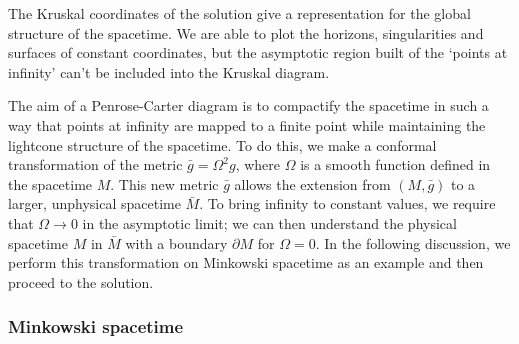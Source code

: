 The Kruskal coordinates of the \sch solution give a representation for the global structure of the spacetime. We are able to plot the horizons, singularities and surfaces of constant coordinates, but the asymptotic region built of the `points at infinity' can't be included into the Kruskal diagram. 

The aim of a Penrose-Carter diagram is to compactify the spacetime in such a way that points at infinity are mapped to a finite point while maintaining the lightcone structure of the spacetime. To do this, we make a conformal transformation of the metric $\bar{g} = \Omega^2 g$, where $\Omega$ is a smooth function defined in the spacetime $M$. This new metric $\bar{g}$ allows the extension from $(M, \bar{g})$ to a larger, unphysical spacetime $\bar{M}$. To bring infinity to constant values, we require that $\Omega \rightarrow 0$ in the asymptotic limit; we can then understand the physical spacetime $M$ in $\bar{M}$ with a boundary $\partial M$ for $\Omega = 0$. In the following discussion, we perform this transformation on Minkowski spacetime as an example and then proceed to the \sch solution. 

\subsubsection{Minkowski spacetime}

